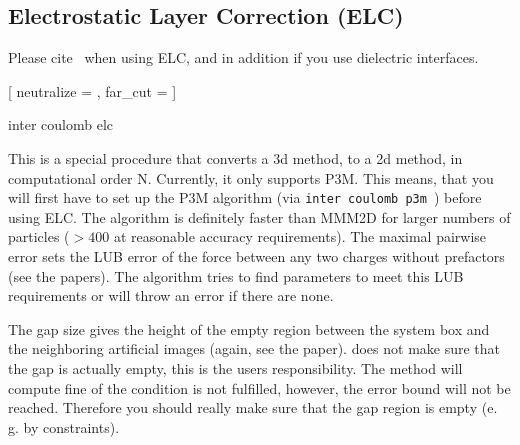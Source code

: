\subsection{Electrostatic Layer Correction (ELC)}

\begin{citebox}
  Please cite~ when using ELC, and in addition
   if you use dielectric interfaces.
\end{citebox}

\begin{pysyntax}
  [
    neutralize = ,
    far_cut = 
  ]
\end{pysyntax}

\begin{essyntax}
  inter coulomb elc  
  \begin{features}
  \end{features}
\end{essyntax}
This is a special procedure that converts a 3d method, to a 2d method,
in computational order N. Currently, it only supports P3M. This means,
that you will first have to set up the P3M algorithm (via
\texttt{inter coulomb p3m }) before using ELC.  The
algorithm is definitely faster than MMM2D for larger numbers of
particles ($>400$ at reasonable accuracy requirements). The maximal
pairwise error  sets the LUB error of
the force between any two charges without prefactors (see the
papers). The algorithm tries to find parameters to meet this LUB
requirements or will throw an error if there are none.

The gap size  gives the height of the empty region
between the system box and the neighboring artificial images (again,
see the paper).  \es does not make sure that the gap is actually
empty, this is the users responsibility. The method will compute fine
of the condition is not fulfilled, however, the error bound will not
be reached. Therefore you should really make sure that the gap region
is empty (e. g. by constraints).


